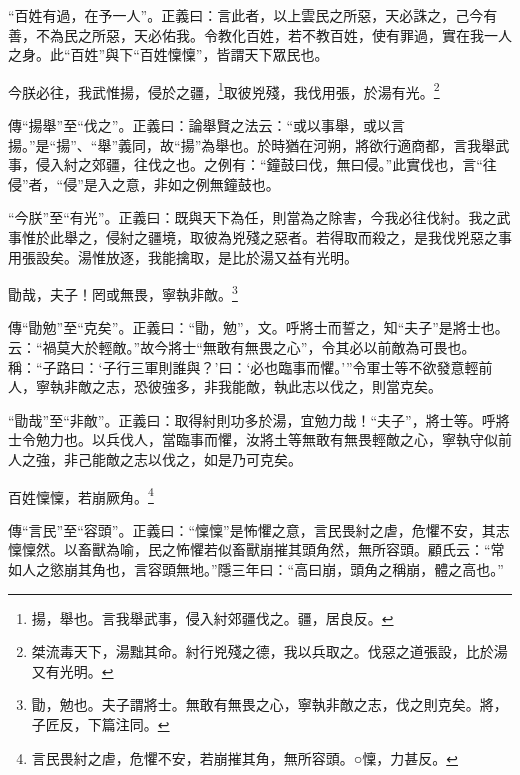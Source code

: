 {\noindent\shu{}\fzkt “百姓有過，在予一人”。正義曰：言此者，以上雲民之所惡，天必誅之，己今有善，不為民之所惡，天必佑我。令教化百姓，若不教百姓，使有罪過，實在我一人之身。此“百姓”與下“百姓懍懍”，皆謂天下眾民也。 \par}

今朕必往，我武惟揚，侵於之疆，\footnote{揚，舉也。言我舉武事，侵入紂郊疆伐之。疆，居良反。}取彼兇殘，我伐用張，於湯有光。\footnote{桀流毒天下，湯黜其命。紂行兇殘之德，我以兵取之。伐惡之道張設，比於湯又有光明。}

{\noindent\zhuan{}\fzbyks 傳“揚舉”至“伐之”。正義曰：論舉賢之法云：“或以事舉，或以言揚。”是“揚”、“舉”義同，故“揚”為舉也。於時猶在河朔，將欲行適商都，言我舉武事，侵入紂之郊疆，往伐之也。之例有：“鐘鼓曰伐，無曰侵。”此實伐也，言“往侵”者，“侵”是入之意，非如之例無鐘鼓也。 \par}

{\noindent\shu{}\fzkt “今朕”至“有光”。正義曰：既與天下為任，則當為之除害，今我必往伐紂。我之武事惟於此舉之，侵紂之疆境，取彼為兇殘之惡者。若得取而殺之，是我伐兇惡之事用張設矣。湯惟放逐，我能擒取，是比於湯又益有光明。 \par}

勖哉，夫子！罔或無畏，寧執非敵。\footnote{勖，勉也。夫子謂將士。無敢有無畏之心，寧執非敵之志，伐之則克矣。將，子匠反，下篇注同。}

{\noindent\zhuan{}\fzbyks 傳“勖勉”至“克矣”。正義曰：“勖，勉”，文。呼將士而誓之，知“夫子”是將士也。云：“禍莫大於輕敵。”故今將士“無敢有無畏之心”，令其必以前敵為可畏也。稱：“子路曰：‘子行三軍則誰與？’曰：‘必也臨事而懼。’”令軍士等不欲發意輕前人，寧執非敵之志，恐彼強多，非我能敵，執此志以伐之，則當克矣。 \par}

{\noindent\shu{}\fzkt “勖哉”至“非敵”。正義曰：取得紂則功多於湯，宜勉力哉！“夫子”，將士等。呼將士令勉力也。以兵伐人，當臨事而懼，汝將土等無敢有無畏輕敵之心，寧執守似前人之強，非己能敵之志以伐之，如是乃可克矣。 \par}

百姓懍懍，若崩厥角。\footnote{言民畏紂之虐，危懼不安，若崩摧其角，無所容頭。○懍，力甚反。}

{\noindent\zhuan{}\fzbyks 傳“言民”至“容頭”。正義曰：“懍懍”是怖懼之意，言民畏紂之虐，危懼不安，其志懍懍然。以畜獸為喻，民之怖懼若似畜獸崩摧其頭角然，無所容頭。顧氏云：“常如人之慾崩其角也，言容頭無地。”隱三年曰：“高曰崩，頭角之稱崩，體之高也。” \par}

